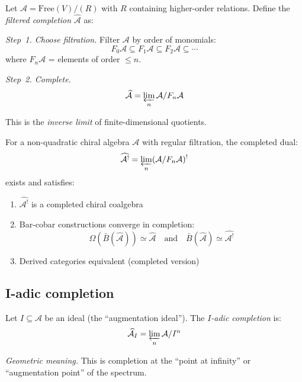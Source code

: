 \begin{definition}\label{def:filtered-completion}
Let $\mathcal{A} = \text{Free}(V) / (R)$ with $R$ containing higher-order relations. 
Define the \emph{filtered completion} $\widehat{\mathcal{A}}$ as:

\emph{Step~1. Choose filtration.}
Filter $\mathcal{A}$ by order of monomials:
\[F_0\mathcal{A} \subseteq F_1\mathcal{A} \subseteq F_2\mathcal{A} \subseteq \cdots\]
where $F_n\mathcal{A}$ = elements of order $\leq n$.

\emph{Step~2. Complete.}
\[\widehat{\mathcal{A}} = \varprojlim_n \mathcal{A} / F_n\mathcal{A}\]

This is the \emph{inverse limit} of finite-dimensional quotients.
\end{definition}

\begin{theorem}\label{thm:completed-koszul-dual}
For a non-quadratic chiral algebra $\mathcal{A}$ with regular filtration, the 
completed dual:
\[\widehat{\mathcal{A}^!} = \varprojlim_n (\mathcal{A} / F_n\mathcal{A})^!\]
exists and satisfies:
\begin{enumerate}
\item $\widehat{\mathcal{A}^!}$ is a completed chiral coalgebra
\item Bar-cobar constructions converge in completion:
      \[\Omega(\bar{B}(\widehat{\mathcal{A}})) \simeq \widehat{\mathcal{A}} \quad \text{and} \quad
      \bar{B}(\widehat{\mathcal{A}}) \simeq \widehat{\mathcal{A}^!}\]
\item Derived categories equivalent (completed version)
\end{enumerate}
\end{theorem}

\subsection{I-adic completion}

\begin{definition}\label{def:i-adic-completion}
Let $I \subseteq \mathcal{A}$ be an ideal (the ``augmentation ideal''). The 
\emph{$I$-adic completion} is:
\[\widehat{\mathcal{A}}_I = \varprojlim_n \mathcal{A} / I^n\]

\emph{Geometric meaning.} This is completion at the ``point at infinity'' or 
``augmentation point'' of the spectrum.
\end{definition}

